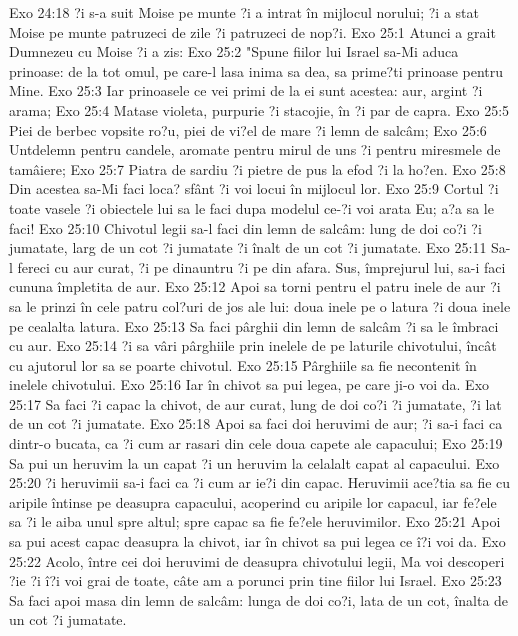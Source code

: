 Exo 24:18  ?i s-a suit Moise pe munte ?i a intrat în mijlocul norului; ?i a stat Moise pe munte patruzeci de zile ?i patruzeci de nop?i.
Exo 25:1  Atunci a grait Dumnezeu cu Moise ?i a zis:
Exo 25:2  "Spune fiilor lui Israel sa-Mi aduca prinoase: de la tot omul, pe care-l lasa inima sa dea, sa prime?ti prinoase pentru Mine.
Exo 25:3  Iar prinoasele ce vei primi de la ei sunt acestea: aur, argint ?i arama;
Exo 25:4  Matase violeta, purpurie ?i stacojie, în ?i par de capra.
Exo 25:5  Piei de berbec vopsite ro?u, piei de vi?el de mare ?i lemn de salcâm;
Exo 25:6  Untdelemn pentru candele, aromate pentru mirul de uns ?i pentru miresmele de tamâiere;
Exo 25:7  Piatra de sardiu ?i pietre de pus la efod ?i la ho?en.
Exo 25:8  Din acestea sa-Mi faci loca? sfânt ?i voi locui în mijlocul lor.
Exo 25:9  Cortul ?i toate vasele ?i obiectele lui sa le faci dupa modelul ce-?i voi arata Eu; a?a sa le faci!
Exo 25:10  Chivotul legii sa-l faci din lemn de salcâm: lung de doi co?i ?i jumatate, larg de un cot ?i jumatate ?i înalt de un cot ?i jumatate.
Exo 25:11  Sa-l fereci cu aur curat, ?i pe dinauntru ?i pe din afara. Sus, împrejurul lui, sa-i faci cununa împletita de aur.
Exo 25:12  Apoi sa torni pentru el patru inele de aur ?i sa le prinzi în cele patru col?uri de jos ale lui: doua inele pe o latura ?i doua inele pe cealalta latura.
Exo 25:13  Sa faci pârghii din lemn de salcâm ?i sa le îmbraci cu aur.
Exo 25:14  ?i sa vâri pârghiile prin inelele de pe laturile chivotului, încât cu ajutorul lor sa se poarte chivotul.
Exo 25:15  Pârghiile sa fie necontenit în inelele chivotului.
Exo 25:16  Iar în chivot sa pui legea, pe care ji-o voi da.
Exo 25:17  Sa faci ?i capac la chivot, de aur curat, lung de doi co?i ?i jumatate, ?i lat de un cot ?i jumatate.
Exo 25:18  Apoi sa faci doi heruvimi de aur; ?i sa-i faci ca dintr-o bucata, ca ?i cum ar rasari din cele doua capete ale capacului;
Exo 25:19  Sa pui un heruvim la un capat ?i un heruvim la celalalt capat al capacului.
Exo 25:20  ?i heruvimii sa-i faci ca ?i cum ar ie?i din capac. Heruvimii ace?tia sa fie cu aripile întinse pe deasupra capacului, acoperind cu aripile lor capacul, iar fe?ele sa ?i le aiba unul spre altul; spre capac sa fie fe?ele heruvimilor.
Exo 25:21  Apoi sa pui acest capac deasupra la chivot, iar în chivot sa pui legea ce î?i voi da.
Exo 25:22  Acolo, între cei doi heruvimi de deasupra chivotului legii, Ma voi descoperi ?ie ?i î?i voi grai de toate, câte am a porunci prin tine fiilor lui Israel.
Exo 25:23  Sa faci apoi masa din lemn de salcâm: lunga de doi co?i, lata de un cot, înalta de un cot ?i jumatate.
